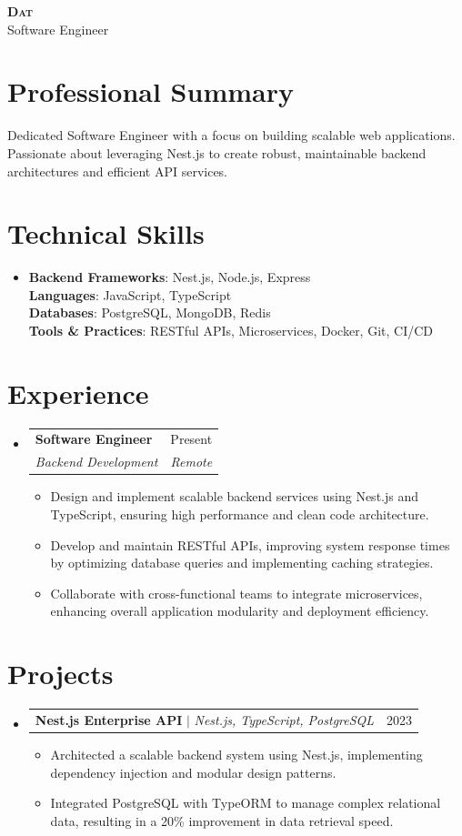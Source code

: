 \documentclass[letterpaper,11pt]{article}
\makeatletter
\newcommand{\resumeItem}[1]{
\item\small{
{#1 \vspace{-2pt}}
}
}
\newcommand{\resumeSubheading}[4]{
\vspace{-2pt}\item
\begin{tabular*}{0.97\textwidth}[t]{l@{\extracolsep{\fill}}r}
\textbf{#1} & #2 \\
\textit{\small#3} & \textit{\small #4} \\
\end{tabular*}\vspace{-7pt}
}
\newcommand{\resumeProjectHeading}[2]{
\item
\begin{tabular*}{0.97\textwidth}{l@{\extracolsep{\fill}}r}
\small#1 & #2 \\
\end{tabular*}\vspace{-7pt}
}
\newcommand{\resumeSubHeadingListStart}{\begin{itemize}[leftmargin=0.15in, label={}]}
\newcommand{\resumeSubHeadingListEnd}{\end{itemize}}
\newcommand{\resumeItemListStart}{\begin{itemize}}
\newcommand{\resumeItemListEnd}{\end{itemize}\vspace{-5pt}}
\makeatother
\begin{document}
\begin{center}
\textbf{\Huge \scshape Dat} \\ \vspace{1pt}
\small Software Engineer
\end{center}

\section{Professional Summary}
Dedicated Software Engineer with a focus on building scalable web applications. Passionate about leveraging Nest.js to create robust, maintainable backend architectures and efficient API services.

\section{Technical Skills}
\begin{itemize}[leftmargin=0.15in, label={}]
\item{
\textbf{Backend Frameworks}{: Nest.js, Node.js, Express} \\
\textbf{Languages}{: JavaScript, TypeScript} \\
\textbf{Databases}{: PostgreSQL, MongoDB, Redis} \\
\textbf{Tools \& Practices}{: RESTful APIs, Microservices, Docker, Git, CI/CD}
}
\end{itemize}

\section{Experience}
\resumeSubHeadingListStart
\resumeSubheading{Software Engineer}{Present}{Backend Development}{Remote}
\resumeItemListStart
\resumeItem{Design and implement scalable backend services using Nest.js and TypeScript, ensuring high performance and clean code architecture.}
\resumeItem{Develop and maintain RESTful APIs, improving system response times by optimizing database queries and implementing caching strategies.}
\resumeItem{Collaborate with cross-functional teams to integrate microservices, enhancing overall application modularity and deployment efficiency.}
\resumeItemListEnd
\resumeSubHeadingListEnd

\section{Projects}
\resumeSubHeadingListStart
\resumeProjectHeading{\textbf{Nest.js Enterprise API} $|$ \emph{Nest.js, TypeScript, PostgreSQL}}{2023}
\resumeItemListStart
\resumeItem{Architected a scalable backend system using Nest.js, implementing dependency injection and modular design patterns.}
\resumeItem{Integrated PostgreSQL with TypeORM to manage complex relational data, resulting in a 20\% improvement in data retrieval speed.}
\resumeItemListEnd
\resumeSubHeadingListEnd
\end{document}
